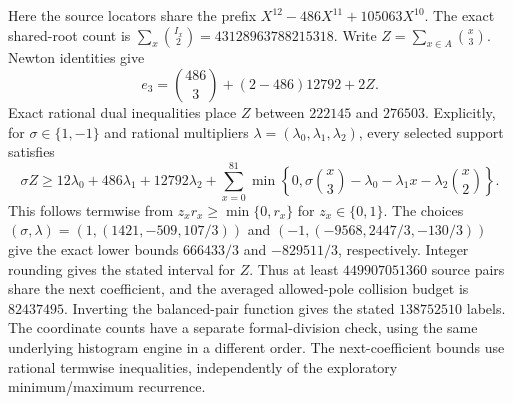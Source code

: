 Here the source locators share the prefix
$X^{12}-486X^{11}+105063X^{10}$. The exact shared-root count is
$\sum_x\binom{I_x}{2}=43128963788215318$. Write
$Z=\sum_{x\in A}\binom{x}{3}$. Newton identities give
\[
 e_3=\binom{486}{3}+(2-486)12792+2Z.
\]
Exact rational dual inequalities place $Z$ between $222145$ and $276503$.
Explicitly, for $\sigma\in\{1,-1\}$ and rational multipliers
$\lambda=(\lambda_0,\lambda_1,\lambda_2)$, every selected support satisfies
\[
 \sigma Z\ge 12\lambda_0+486\lambda_1+12792\lambda_2
 +\sum_{x=0}^{81}\min\left\{0,
 \sigma\binom{x}{3}-\lambda_0-\lambda_1x-\lambda_2\binom{x}{2}\right\}.
\]
This follows termwise from $z_xr_x\ge\min\{0,r_x\}$ for
$z_x\in\{0,1\}$. The choices
$(\sigma,\lambda)=(1,(1421,-509,107/3))$ and
$(-1,(-9568,2447/3,-130/3))$ give the exact lower bounds
$666433/3$ and $-829511/3$, respectively. Integer rounding gives
the stated interval for $Z$.
Thus at least $449907051360$ source pairs share the next coefficient,
and the averaged allowed-pole collision budget is $82437495$.
Inverting the balanced-pair function gives the stated $138752510$ labels.
The coordinate counts have a separate formal-division check, using the
same underlying histogram engine in a different order. The next-coefficient
bounds use rational termwise inequalities, independently of the exploratory
minimum/maximum recurrence.

